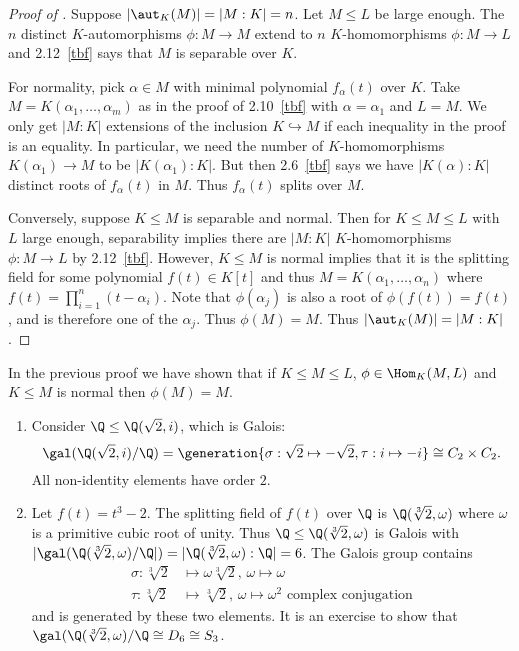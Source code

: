 \documentclass[a4paper]{article}
\begin{document}
\begin{proof}[Proof of ]
  \label{proof:galois criterion}
  Suppose \(|\aut_K(M)| = |M:K| = n\). Let \(M \leq L\) be large enough. The \(n\) distinct \(K\)-automorphisms \(\phi: M \to M\) extend to \(n\) \(K\)-homomorphisms \(\phi: M \to L\) and 2.12~\ref{tbf} says that \(M\) is separable over \(K\).

  For normality, pick \(\alpha \in M\) with minimal polynomial \(f_\alpha(t)\) over \(K\). Take \(M = K(\alpha_1, \dots, \alpha_m)\) as in the proof of 2.10~\ref{tbf} with \(\alpha = \alpha_1\) and \(L = M\). We only get \(|M:K|\) extensions of the inclusion \(K \hookrightarrow M\) if each inequality in the proof is an equality. In particular, we need the number of \(K\)-homomorphisms \(K(\alpha_1) \to M\) to be \(|K(\alpha_1):K|\). But then 2.6~\ref{tbf} says we have \(|K(\alpha):K|\) distinct roots of \(f_\alpha(t)\) in \(M\). Thus \(f_\alpha(t)\) splits over \(M\).

  Conversely, suppose \(K \leq M\) is separable and normal. Then for \(K \leq M \leq L\) with \(L\) large enough, separability implies there are \(|M:K|\) \(K\)-homomorphisms \(\phi: M \to L\) by 2.12~\ref{tbf}. However, \(K \leq M\) is normal implies that it is the splitting field for some polynomial \(f(t) \in K[t]\) and thus \(M = K(\alpha_1, \dots, \alpha_n)\) where \(f(t) = \prod_{i = 1}^n (t - \alpha_i)\). Note that \(\phi(\alpha_j)\) is also a root of \(\phi(f(t)) = f(t)\), and is therefore one of the \(\alpha_j\). Thus \(\phi(M) = M\). Thus \(|\aut_K(M)| = |M:K|\).
\end{proof}

\begin{remark}
  In the previous proof we have shown that if \(K \leq M \leq L\), \(\phi \in \Hom_K(M, L)\) and \(K \leq M\) is normal then \(\phi(M) = M\).
\end{remark}

\begin{eg}\leavevmode
  \begin{enumerate}
  \item Consider \(\Q \leq \Q(\sqrt 2, i)\), which is Galois:
    \[
      \gal(\Q(\sqrt 2, i)/\Q) = \generation{\sigma: \sqrt 2 \mapsto -\sqrt 2, \tau: i \mapsto -i} \cong C_2 \times C_2.
    \]
    All non-identity elements have order \(2\).
  \item Let \(f(t) = t^3 - 2\). The splitting field of \(f(t)\) over \(\Q\) is \(\Q(\sqrt[3]{2}, \omega)\) where \(\omega\) is a primitive cubic root of unity. Thus \(\Q \leq \Q(\sqrt[3]{2}, \omega)\) is Galois with \(|\gal(\Q(\sqrt[3]{2}, \omega)/\Q|) = |\Q(\sqrt[3]{2}, \omega):\Q| = 6\). The Galois group contains
    \begin{align*}
      \sigma: \sqrt[3]{2} &\mapsto \omega\sqrt[3]{2}, \, \omega \mapsto \omega \\
      \tau: \sqrt[3]{2} &\mapsto \sqrt[3]{2}, \, \omega \mapsto \omega^2 \text{ complex conjugation}
    \end{align*}
    and is generated by these two elements. It is an exercise to show that \(\gal(\Q(\sqrt[3]{2}, \omega)/\Q \cong D_6 \cong S_3\).
  \end{enumerate}
\end{eg}
\end{document}
